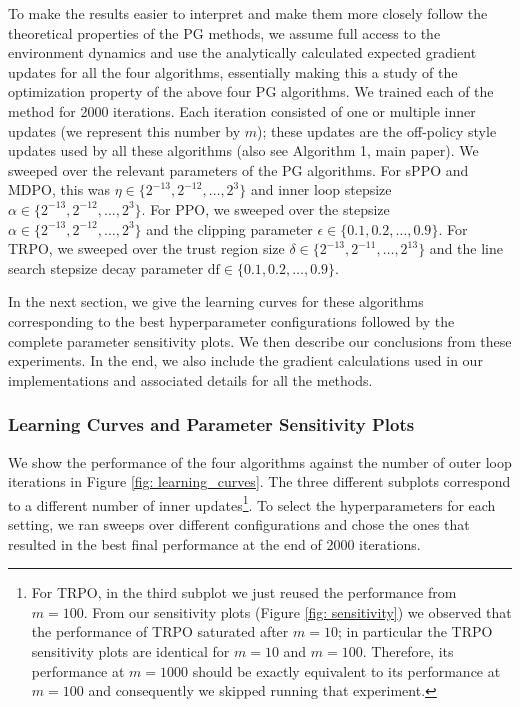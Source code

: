 \documentclass[a4paper, 10pt]{article}
\begin{document}
To make the results easier to interpret and make them more closely follow the theoretical properties of the PG methods, we assume full access to the environment dynamics and use the analytically calculated expected gradient updates for all the four algorithms, essentially making this a study of the optimization property of the above four PG algorithms. We trained each of the method for 2000 iterations. Each iteration consisted of one or multiple inner updates (we represent this number by $m$); these updates are the off-policy style updates used by all these algorithms (also see Algorithm 1, main paper). We sweeped over the relevant parameters of the PG algorithms. For sPPO and MDPO, this was $\eta \in \{2^{-13}, 2^{-12}, \ldots, 2^3\}$ and inner loop stepsize $\alpha \in \{2^{-13}, 2^{-12}, \ldots, 2^3\}$. For PPO, we sweeped over the stepsize $\alpha \in \{2^{-13}, 2^{-12}, \ldots, 2^3\}$ and the clipping parameter $\epsilon \in \{0.1, 0.2, \ldots, 0.9\}$. For TRPO, we sweeped over the trust region size $\delta \in \{2^{-13}, 2^{-11}, \ldots, 2^{13}\}$ and the line search stepsize decay parameter $\text{df} \in \{0.1, 0.2, \ldots, 0.9\}$.

In the next section, we give the learning curves for these algorithms corresponding to the best hyperparameter configurations followed by the complete parameter sensitivity plots. We then describe our conclusions from these experiments. In the end, we also include the gradient calculations used in our implementations and associated details for all the methods.

\subsubsection{Learning Curves and Parameter Sensitivity Plots}
We show the performance of the four algorithms against the number of outer loop iterations in Figure \ref{fig: learning_curves}. The three different subplots correspond to a different number of inner updates\footnote{For TRPO, in the third subplot we just reused the performance from $m=100$. From our sensitivity plots (Figure \ref{fig: sensitivity}) we observed that the performance of TRPO saturated after $m = 10$; in particular the TRPO sensitivity plots are identical for $m=10$ and $m=100$. Therefore, its performance at $m=1000$ should be exactly equivalent to its performance at $m=100$ and consequently we skipped running that experiment.}. To select the hyperparameters for each setting, we ran sweeps over different configurations and chose the ones that resulted in the best final performance at the end of 2000 iterations.
\end{document}
